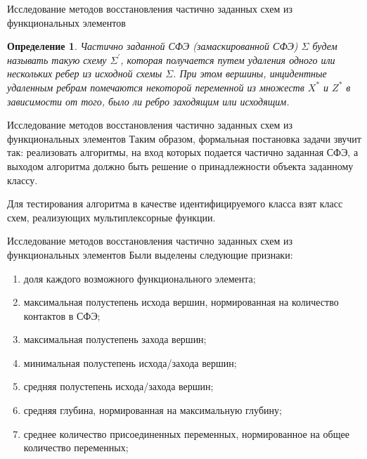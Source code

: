 \documentclass[serif,utf8]{beamer}
\newtheorem{mydef}{Определение}
\begin{document}
\begin{frame}{Исследование методов восстановления частично заданных схем из функциональных элементов}

\begin{mydef}
Частично заданной СФЭ (замаскированной СФЭ) $\Sigma$ будем называть такую схему $\Sigma^{'}$, которая получается путем удаления одного или нескольких ребер из исходной схемы $\Sigma$. При этом вершины, инцидентные удаленным ребрам помечаются некоторой переменной из множеств $X^{\ast}$ и $Z^{\ast}$ в зависимости от того, было ли ребро заходящим или исходящим.
\end{mydef}

\end{frame}

\begin{frame}{Исследование методов восстановления частично заданных схем из функциональных элементов}
Таким образом, формальная постановка задачи звучит так: реализовать алгоритмы, на вход которых подается частично заданная СФЭ, а выходом алгоритма должно быть решение о принадлежности объекта заданному классу.\par
Для тестирования алгоритма в качестве идентифицируемого класса взят класс схем, реализующих мультиплексорные функции.
\end{frame}

\begin{frame}{Исследование методов восстановления частично заданных схем из функциональных элементов}
Были выделены следующие признаки:
\begin{enumerate}
\item доля каждого возможного функционального элемента;
\item максимальная полустепень исхода вершин, нормированная на количество контактов в СФЭ;
\item максимальная полустепень захода вершин;
\item минимальная полустепень исхода/захода вершин;
\item средняя полустепень исхода/захода вершин;
\item средняя глубина, нормированная на максимальную глубину;
\item среднее количество присоединенных переменных, нормированное на общее количество переменных;
\end{enumerate}
\end{frame}
\end{document}
